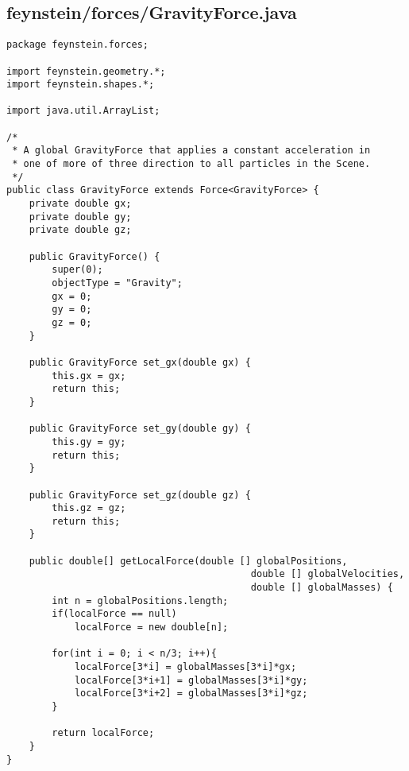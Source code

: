 \subsection*{feynstein/forces/GravityForce.java}
\begin{lstlisting}
package feynstein.forces;

import feynstein.geometry.*;
import feynstein.shapes.*;

import java.util.ArrayList;

/*
 * A global GravityForce that applies a constant acceleration in
 * one of more of three direction to all particles in the Scene.
 */
public class GravityForce extends Force<GravityForce> {
	private double gx;
	private double gy;
	private double gz;

    public GravityForce() {
		super(0);
		objectType = "Gravity";
		gx = 0;
		gy = 0;
		gz = 0;
    }
 
    public GravityForce set_gx(double gx) {
		this.gx = gx;
		return this;
    }
	
	public GravityForce set_gy(double gy) {
		this.gy = gy;
		return this;
    }
	
	public GravityForce set_gz(double gz) {
		this.gz = gz;
		return this;
    }

	public double[] getLocalForce(double [] globalPositions,
										   double [] globalVelocities,
										   double [] globalMasses) {
		int n = globalPositions.length;
		if(localForce == null)
			localForce = new double[n];
		
		for(int i = 0; i < n/3; i++){
			localForce[3*i] = globalMasses[3*i]*gx;
			localForce[3*i+1] = globalMasses[3*i]*gy;
			localForce[3*i+2] = globalMasses[3*i]*gz;
		}
		
		return localForce;
	}
}
\end{lstlisting}

